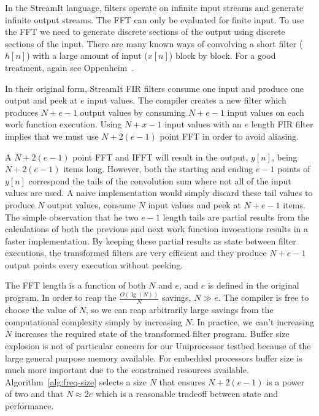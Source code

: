 In the StreamIt language, filters operate on infinite input streams 
and generate infinite output streams.
The FFT can only be evaluated for finite input. To use the FFT we need to
generate discrete sections of the output using discrete sections of the input.
There are many known ways of convolving a short filter ($h[n]$) with
a large amount of input ($x[n]$) block by block.
For a good treatment, again see Oppenheim~\cite{oppenheim-discrete}. 

In their original form, StreamIt FIR filters consume one input and 
produce one output and peek at $e$ input values. The compiler creates 
a new filter which produces $N+e-1$ output values by consuming $N+e-1$ input 
values on each work function execution. 
Using $N+x-1$ input values with an $e$ length FIR filter implies that we
must use $N+2(e-1)$ point FFT in order to avoid aliasing.

A $N+2(e-1)$ point FFT and IFFT will result in the output, $y[n]$, being $N+2(e-1)$
items long. However, both the starting and ending $e-1$ points of $y[n]$ correspond
the tails of the convolution sum where not all of the input values are used. 
A naive implementation would simply discard these tail values to produce 
$N$ output values, consume $N$ input values and peek at $N+e-1$ items.
The simple observation that he two $e-1$ length tails are partial results from the 
calculations of both the previous and next work function invocations results in 
a faster implementation. By keeping these partial results as state between
filter executions, the transformed filters are very efficient and they 
produce $N+e-1$ output points every execution without peeking.

The FFT length is a function of both $N$ and $e$, and $e$ is defined in the
original program. In order to reap the $\frac{O(\lg(N))}{N}$ savings, 
$N \gg e$. The compiler is free to choose the value of $N$, 
so we can reap arbitrarily large savings from the computational complexity 
simply by increasing $N$. 
In practice, we can't increasing $N$ increases the required state
of the transformed filter program. Buffer size explosion is
not of particular concern for our Uniprocessor testbed because of the large
general purpose memory available. For embedded processors 
buffer size is much more important due to the constrained resources available.
Algorithm~\ref{alg:freq-size} selects a size $N$ that ensures 
$N+2(e-1)$ is a power of two and that $N \approx 2e$ which is a 
reasonable tradeoff between state and performance.


